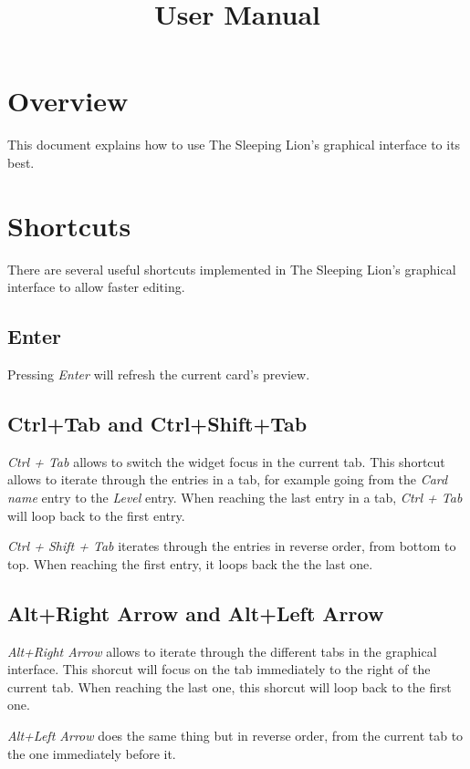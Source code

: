 \documentclass{article}
\title{User Manual}
\date{}
\begin{document}
\maketitle
\tableofcontents

\section{Overview}
This document explains how to use The Sleeping Lion's graphical interface to its best.

\section{Shortcuts}
There are several useful shortcuts implemented in The Sleeping Lion's graphical interface to allow faster editing.

\subsection{Enter}
Pressing \textit{Enter} will refresh the current card's preview.

\subsection{Ctrl+Tab and Ctrl+Shift+Tab}
\textit{Ctrl + Tab} allows to switch the widget focus in the current tab. This shortcut allows to iterate through the entries in a tab, for example going from the \textit{Card name} entry to the \textit{Level} entry. When reaching the last entry in a tab, \textit{Ctrl + Tab} will loop back to the first entry.

\textit{Ctrl + Shift + Tab} iterates through the entries in reverse order, from bottom to top. When reaching the first entry, it loops back the the last one.

\subsection{Alt+Right Arrow and Alt+Left Arrow}
\textit{Alt+Right Arrow} allows to iterate through the different tabs in the graphical interface. This shorcut will focus on the tab immediately to the right of the current tab. When reaching the last one, this shorcut will loop back to the first one.

\textit{Alt+Left Arrow} does the same thing but in reverse order, from the current tab to the one immediately before it.
\end{document}
